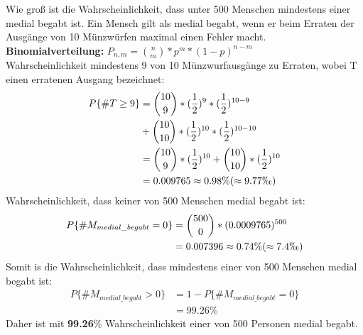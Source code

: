 \documentclass[11pt,a4paper]{article}
\begin{document}
    Wie groß ist die Wahrscheinlichkeit, dass unter 500 Menschen mindestens einer medial begabt ist. Ein Mensch gilt als medial begabt, wenn er beim Erraten der Ausgänge von 10 Münzwürfen maximal einen Fehler macht.\\
    \newline
    \textbf{Binomialverteilung:} $ P_{n,m} = \binom{n}{m} * p^m * (1-p)^{n-m} $ \\
    \newline
    Wahrscheinlichkeit mindestens 9 von 10 Münzwurfausgänge zu Erraten, wobei T einen erratenen Ausgang bezeichnet:
    \begin{equation}
      \begin{split}
        P\{ \# T \geq 9 \} & = \binom{10}{9} * (\frac{1}{2})^9 * (\frac{1}{2})^{10-9} \\
        & + \binom{10}{10} * (\frac{1}{2})^{10} * (\frac{1}{2})^{10-10} \\
        & = \binom{10}{9} * (\frac{1}{2})^{10} + \binom{10}{10} * (\frac{1}{2})^{10} \\
        & = 0.009765 \approx 0.98\% (\approx 9.77 \permil )
      \end{split}
    \end{equation}
    Wahrscheinlichkeit, dass keiner von 500 Menschen medial begabt ist:
    \begin{equation}
      \begin{split}
        P\{ \# M_{medial\_ begabt} = 0 \} & = \binom{500}{0} * (0.0009765)^{500} \\
        & = 0.007396 \approx 0.74\% (\approx 7.4 \permil )
      \end{split}
    \end{equation}
    Somit is die Wahrscheinlichkeit, dass mindestens einer von 500 Menschen medial begabt ist:
    \begin{equation}
      \begin{split}
        P\{ \# M_{medial\_ begabt} > 0 \} & = 1 - P\{ \# M_{medial\_ begabt} = 0 \} \\
        & = 99.26\% 
      \end{split}
    \end{equation}
    Daher ist mit \textbf{99.26}\% Wahrscheinlichkeit einer von 500 Personen medial begabt.
	
\end{document}
